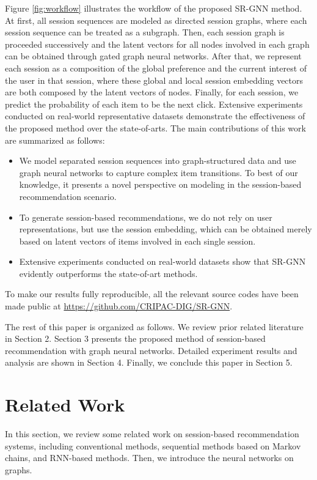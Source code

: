 \documentclass[letterpaper]{article} \usepackage{cite}
\begin{document}
Figure \ref{fig:workflow} illustrates the workflow of the proposed SR-GNN method. At first, all session sequences are modeled as directed session graphs, where each session sequence can be treated as a subgraph. Then, each session graph is proceeded successively and the latent vectors for all nodes involved in each graph can be obtained through gated graph neural networks. After that, we represent each session as a composition of the global preference and the current interest of the user in that session, where these global and local session embedding vectors are both composed by the latent vectors of nodes. Finally, for each session, we predict the probability of each item to be the next click. Extensive experiments conducted on real-world representative datasets demonstrate the effectiveness of the proposed method over the state-of-arts. The main contributions of this work are summarized as follows:
\begin{itemize}
	\item We model separated session sequences into graph-structured data and use graph neural networks to capture complex item transitions. To best of our knowledge, it presents a novel perspective on modeling in the session-based recommendation scenario.
	\item To generate session-based recommendations, we do not rely on user representations, but use the session embedding, which can be obtained merely based on latent vectors of items involved in each single session.
	\item Extensive experiments conducted on real-world datasets show that SR-GNN evidently outperforms the state-of-art methods.
\end{itemize}

To make our results fully reproducible, all the relevant source codes have been made public at \url{https://github.com/CRIPAC-DIG/SR-GNN}.

The rest of this paper is organized as follows. We review prior related literature in Section 2. Section 3 presents the proposed method of session-based recommendation with graph neural networks. Detailed experiment results and analysis are shown in Section 4. Finally, we conclude this paper in Section 5.

\section{Related Work}

In this section, we review some related work on session-based recommendation systems, including conventional methods, sequential methods based on Markov chains, and RNN-based methods. Then, we introduce the neural networks on graphs.
\end{document}
